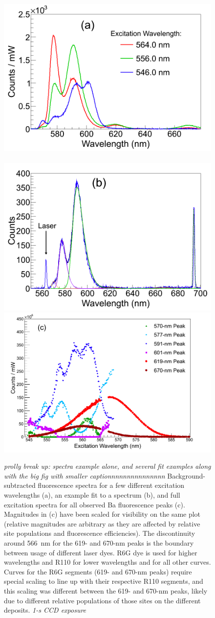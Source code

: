 \begin{figure} %
        \centering
                \includegraphics[width=.5\textwidth]{figures/excitspec_grn_spectra_v2.png}
                ~
                \includegraphics[width=.5\textwidth]{figures/excitspec_grn_spectra_fit.png}
                \includegraphics[width=.95\textwidth]{figures/excitspec_grn.png}
                \caption{\emph{\color{gray}prolly break up: spectra example alone, and several fit examples along with the big fig with smaller captionnnnnnnnnnnnnnn} Background-subtracted fluorescence spectra for a few different excitation wavelengths (a), an example fit to a spectrum (b), and full excitation spectra for all observed Ba fluorescence peaks (c).  Magnitudes in (c) have been scaled for visibility on the same plot (relative magnitudes are arbitrary as they are affected by relative site populations and fluorescence efficiencies).  The discontinuity around 566~nm for the 619- and 670-nm peaks is the boundary between usage of different laser dyes.  R6G dye is used for higher wavelengths and R110 for lower wavelengths and for all other curves.  Curves for the R6G segments (619- and 670-nm peaks) require special scaling to line up with their respective R110 segments, and this scaling was different between the 619- and 670-nm peaks, likely due to different relative populations of those sites on the different deposits. \emph{\color{gray}1-s CCD exposure}}
\label{fig:excitspecGrn}
\end{figure}

